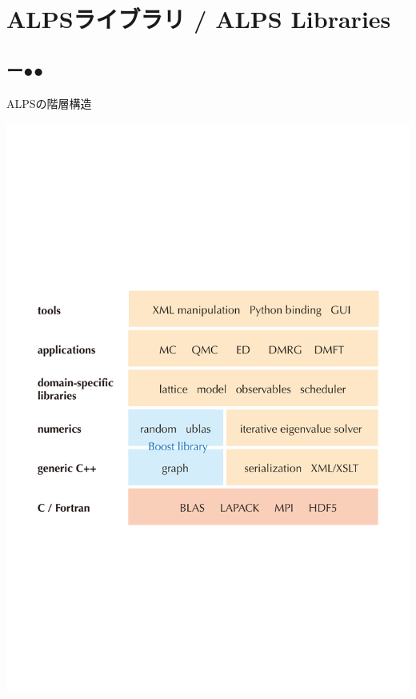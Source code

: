 \section{ALPSライブラリ / ALPS Libraries}
\subsection*{{\protect\color{red}ー}{\protect\color{blue}●}{\protect\color{green}●}}

\begin{frame}[t,fragile]{ALPSの階層構造}
  \begin{center}
    \includegraphics[height=0.65\textheight]{hierarchy.pdf}
  \end{center}
\end{frame}

